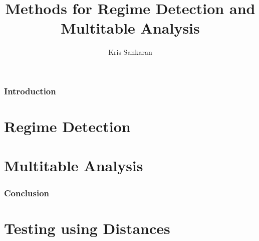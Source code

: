 \documentclass{beamer}
\title{Methods for Regime Detection and Multitable Analysis}
\author{Kris Sankaran}
\begin{document}
\begin{frame}
  \frametitle{Introduction}
\end{frame}

\section{Regime Detection}
\label{sec:regime_detection}

\section{Multitable Analysis}
\label{sec:multitable analysis}

\begin{frame}
  \frametitle{Conclusion}
  
\end{frame}

\section{Testing using Distances}
\label{sec:testing_distances}
\end{document}
